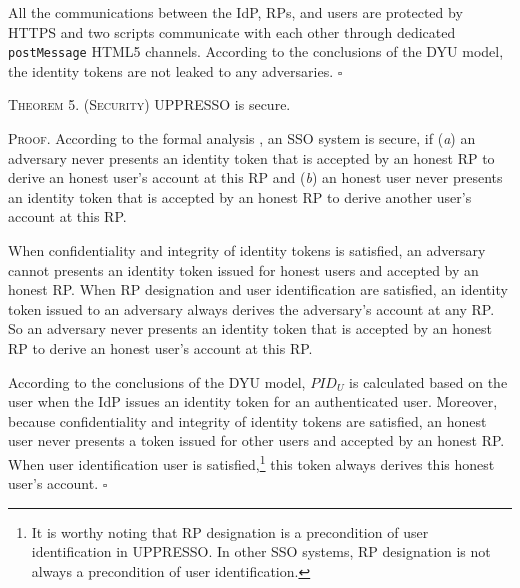 {All the communications between the IdP, RPs, and users are protected by HTTPS
 and two scripts communicate with each other through dedicated \verb+postMessage+ HTML5 channels.
According to the conclusions of the DYU model, 
 the identity tokens are not leaked to any adversaries. \hfill $\square$


\vspace{1mm}
\noindent\textsc{Theorem 5. (Security)} {UPPRESSO is secure.}

\vspace{0.75mm}
\noindent\textsc{Proof.}
According to the formal analysis \cite{SPRESSO,FettKS14},
    an SSO system is secure, if (\emph{a}) an adversary never presents an identity token that is accepted by an honest RP to derive an honest user's account at this RP
    and (\emph{b}) an honest user never presents an identity token that is accepted by an honest RP to derive another user's account at this RP.


When confidentiality and integrity of identity tokens is satisfied,
    an adversary cannot presents an identity token issued for honest users and accepted by an honest RP.
When RP designation and user identification are satisfied,
    an identity token issued to an adversary always derives the adversary's account at any RP.
So an adversary never presents an identity token that is accepted by an honest RP to derive an honest user's account at this RP.


According to the conclusions of the DYU model,
    $PID_U$ is calculated based on the user when the IdP issues an identity token for an authenticated user.
Moreover, because confidentiality and integrity of identity tokens are satisfied,
    an honest user never presents a token issued for other users and accepted by an honest RP.
When user identification user is satisfied,\footnote{It is worthy noting that RP designation is a precondition of user identification in UPPRESSO. In other SSO systems, RP designation is not always a precondition of user identification.}
    this token always derives this honest user's account.
\hfill $\square$

}
